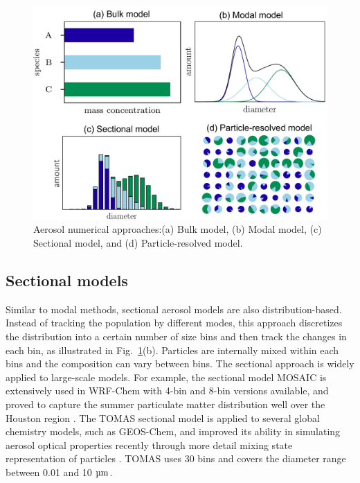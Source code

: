 \documentclass[edeposit,fullpage]{uiucthesis2009}
\begin{document}
\begin{figure}
	\centering
	\includegraphics[scale=0.5]{chap1_figs/thesis_chap1_fig5.pdf}
	\caption{Aerosol numerical approaches:(a) Bulk model, (b) Modal model, (c)
          Sectional model, and (d) Particle-resolved model.}
	\label{fig:chap1-aerosol-model}
\end{figure}

\subsection{Sectional models}
Similar to modal methods, sectional aerosol models are also
distribution-based. Instead of tracking the population by different
modes, this approach discretizes the distribution into a certain
number of size bins and then track the changes in each bin, as
illustrated in Fig.~\ref{fig:chap1-aerosol-model}(b). Particles are
internally mixed within each bins and the composition can vary between
bins. The sectional approach is widely applied to large-scale
models. For example, the sectional model MOSAIC is extensively used in
WRF-Chem with 4-bin and 8-bin versions available, and proved to
capture the summer particulate matter distribution well over the
Houston region \citep{zaveri2008model,fast2006evolution}. The TOMAS
sectional model is applied to several global chemistry models, such as
GEOS-Chem, and improved its ability in simulating aerosol optical
properties recently through more detail mixing state representation of
particles
\citep{adams2002predicting,pierce2013weak,kodros2018size}. TOMAS uses
30 bins and covers the diameter range between 0.01 and 10 $\rm \mu m$.
\end{document}
